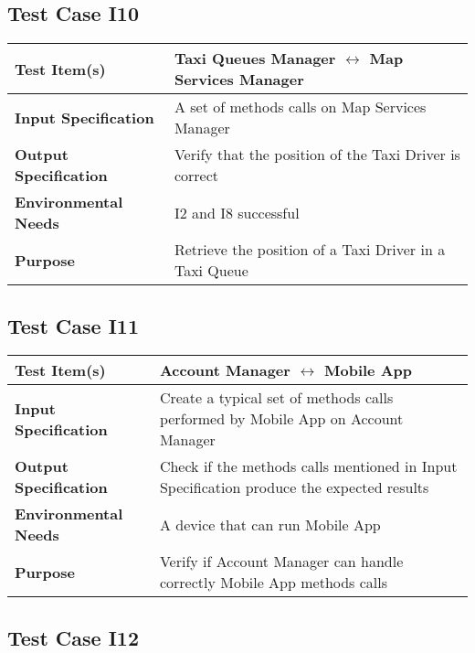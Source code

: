    \subsection{Test Case I10}
   
   	\begin{tabular}{p{} p{}}
   		\hline
   		\textbf{Test Item(s)} & Taxi Queues Manager  $ \longleftrightarrow $ Map Services Manager    \\
   		\hline
   		\textbf{Input Specification} & A set of methods calls on Map Services Manager\\
   		\hline
   		\textbf{Output Specification} & Verify that the position of the Taxi Driver is correct\\
   		\hline
   		\textbf{Environmental Needs} &  I2 and I8 successful\\
   		\hline
   		\textbf{Purpose} & Retrieve the position of a Taxi Driver in a Taxi Queue \\
   		\hline
   	\end{tabular}
   

  
   \newpage
  
  \subsection{Test Case I11}
  
  	\begin{tabular}{p{} p{}}
  		\hline
  		\textbf{Test Item(s)} & Account Manager $ \longleftrightarrow $   Mobile App\\
  		\hline
  		\textbf{Input Specification} & Create a typical set of methods calls performed by Mobile App on Account Manager\\
  		\hline
  		\textbf{Output Specification} & Check if the methods calls mentioned in Input Specification produce the expected results\\
  		\hline
  		\textbf{Environmental Needs} &  A device that can run Mobile App\\
  		\hline
  		\textbf{Purpose} & Verify if Account Manager can handle correctly Mobile App methods calls \\
  		\hline
  	\end{tabular}
  
  
  \subsection{Test Case I12}
  
